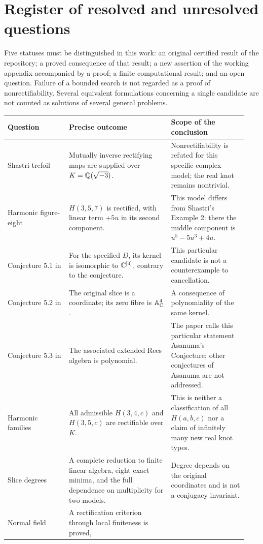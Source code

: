\section{Register of resolved and unresolved questions}
Five statuses must be distinguished in this work: an original certified
result of the repository; a proved consequence of that result; a new assertion
of the working appendix accompanied by a proof; a finite computational result;
and an open question. Failure of a bounded search is not regarded as a proof
of nonrectifiability. Several equivalent formulations concerning a single
candidate are not counted as solutions of several general problems.

\begin{longtable}{@{}L{0.24\linewidth}L{0.40\linewidth}L{0.30\linewidth}@{}}
\toprule Question & Precise outcome & Scope of the conclusion\\\midrule\endhead
Shastri trefoil & Mutually inverse rectifying maps are supplied over
$K={\mathbb{Q}}(\sqrt{-3})$. & Nonrectifiability is refuted for this specific complex
model; the real knot remains nontrivial.\\[5pt]
Harmonic figure-eight & $H(3,5,7)$ is rectified, with linear term
$+5u$ in its second component. & This model differs from Shastri's Example 2:
there the middle component is $u^5-5u^3+4u$.\\[5pt]
Conjecture 5.1 in \cite{vdER} & For the specified $D$, its kernel is
isomorphic to ${\mathbb{C}}^{[4]}$, contrary to the conjecture. & This particular
candidate is not a counterexample to cancellation.\\[5pt]
Conjecture 5.2 in \cite{vdER} & The original slice is a coordinate;
its zero fibre is ${\mathbb{A}}^4_{\mathbb{C}}$. & A consequence of polynomiality of the same kernel.\\[5pt]
Conjecture 5.3 in \cite{vdER} & The associated extended Rees algebra
is polynomial. & The paper calls this particular statement Asanuma's
Conjecture; other conjectures of Asanuma are not addressed.\\[5pt]
Harmonic families & All admissible $H(3,4,c)$ and $H(3,5,c)$
are rectifiable over $K$. & This is neither a classification of all
$H(a,b,c)$ nor a claim of infinitely many new real knot types.\\[5pt]
Slice degrees & A complete reduction to finite linear algebra, eight exact
minima, and the full dependence on multiplicity for two models. & Degree
depends on the original coordinates and is not a conjugacy invariant.\\[5pt]
Normal field & A rectification criterion through local finiteness is proved,

\end{longtable}
